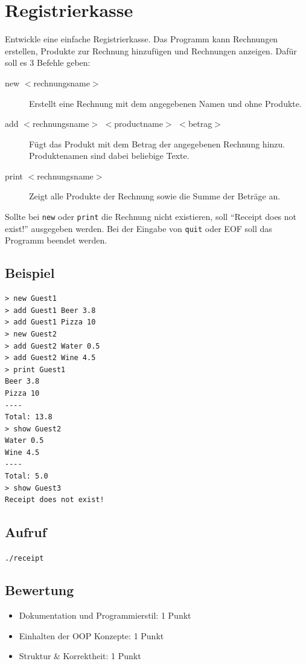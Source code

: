 \documentclass[a4paper,10pt]{article}
\begin{document}
\section*{Registrierkasse}

Entwickle eine einfache Registrierkasse. Das Programm kann Rechnungen erstellen, Produkte zur Rechnung hinzufügen und Rechnungen anzeigen. Dafür soll es 3 Befehle geben:

\begin{description}
 \item[new $<$rechnungsname$>$] Erstellt eine Rechnung mit dem angegebenen Namen und ohne Produkte.
 \item[add $<$rechnungsname$>$ $<$productname$>$ $<$betrag$>$] Fügt das Produkt mit dem Betrag der angegebenen Rechnung hinzu. Produktenamen sind dabei beliebige Texte.
 \item[print $<$rechnungsname$>$] Zeigt alle Produkte der Rechnung sowie die Summe der Beträge an.
\end{description}

Sollte bei \texttt{new} oder \texttt{print} die Rechnung nicht existieren, soll ``Receipt does not exist!'' ausgegeben werden. Bei der Eingabe von \texttt{quit} oder EOF soll das Programm beendet werden.

\subsection*{Beispiel}
\begin{verbatim}
> new Guest1
> add Guest1 Beer 3.8
> add Guest1 Pizza 10
> new Guest2
> add Guest2 Water 0.5
> add Guest2 Wine 4.5
> print Guest1
Beer 3.8
Pizza 10
----
Total: 13.8
> show Guest2
Water 0.5
Wine 4.5
----
Total: 5.0
> show Guest3
Receipt does not exist!
\end{verbatim}

\subsection*{Aufruf}
\texttt{./receipt}

\subsection*{Bewertung}
\begin{itemize}
 \item Dokumentation und Programmierstil: 1 Punkt
 \item Einhalten der OOP Konzepte: 1 Punkt
 \item Struktur \& Korrektheit: 1 Punkt
\end{itemize}

\newpage
\end{document}
